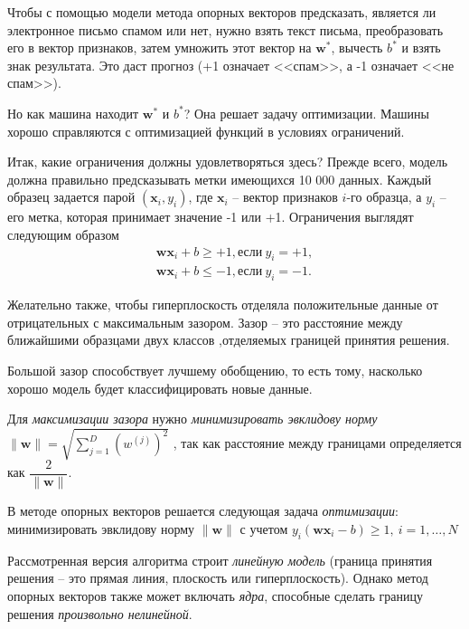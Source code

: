 \documentclass[%
	11pt,
	a4paper,
	utf8,
		]{article}
\begin{document}
Чтобы с помощью модели метода опорных векторов предсказать, является ли электронное письмо спамом или нет, нужно взять текст письма, преобразовать его в вектор признаков, затем умножить этот вектор на $ \mathbf{w}^{*} $, вычесть $ b^{*} $ и взять знак результата. Это даст прогноз (+1 означает <<спам>>, а -1 означает <<не спам>>).

Но как машина находит $ \mathbf{w}^{*} $ и $ b^{*} $? Она решает задачу оптимизации. Машины хорошо справляются с оптимизацией функций в условиях ограничений.

Итак, какие ограничения должны удовлетворяться здесь? Прежде всего, модель должна правильно предсказывать метки имеющихся 10 000 данных. Каждый образец задается парой $ (\mathbf{x}_i, y_i) $, где $ \mathbf{x}_i $ -- вектор признаков $ i $-го образца, а $ y_i $ -- его метка, которая принимает значение -1 или +1. Ограничения выглядят следующим образом \cite{burkov:2020} 
\begin{align*}
	\mathbf{w} \mathbf{x}_i + b\geqslant +1, \text{если} \ y_i = +1,\\
	\mathbf{w} \mathbf{x}_i + b\leqslant -1, \text{если} \ y_i = -1.
\end{align*}

Желательно также, чтобы гиперплоскость отделяла положительные данные от отрицательных с максимальным зазором. Зазор -- это расстояние между ближайшими образцами двух классов ,отделяемых границей принятия решения.

Большой зазор способствует  лучшему обобщению, то есть тому, насколько хорошо модель будет классифицировать новые данные.

Для \emph{максимизации зазора} нужно \emph{минимизировать эвклидову норму} $ \| \mathbf{w} \| = \sqrt{ \sum\limits_{j=1}^D (w^{(j)})^2 }$ \cite[]{burkov:2020}, так как расстояние между границами определяется как $ \dfrac{2}{ \| \mathbf{w} \| } $.

{В методе опорных векторов решается следующая задача \emph{оптимизации}: минимизировать эвклидову норму  $ \| \mathbf{w} \| $ с учетом $ y_i (\mathbf{w} \mathbf{x}_i - b) \geqslant 1, \ i = 1, \ldots, N $}

Рассмотренная версия алгоритма строит \emph{линейную модель} (граница принятия решения -- это прямая линия, плоскость или гиперплоскость). Однако метод опорных векторов также может включать \emph{ядра}, способные сделать границу решения \emph{произвольно нелинейной}.

\end{document}
